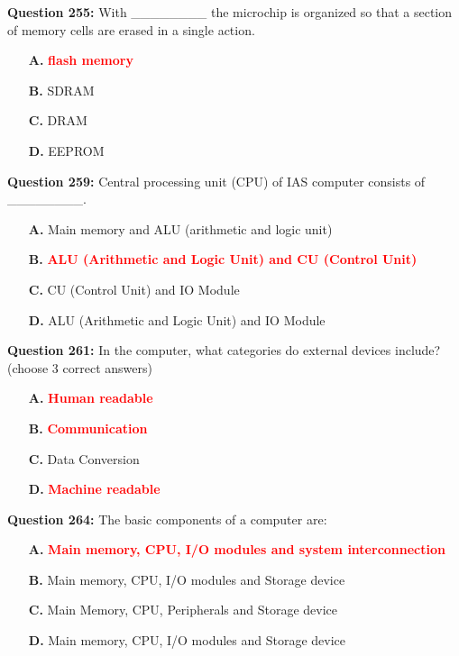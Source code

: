 \documentclass[12pt,a4paper]{article}
\begin{document}
\vspace{0.5cm}

\textbf{Question 255:} With ________ the microchip is organized so that a section of memory cells are erased in a single action.

\begin{itemize}
    \item[\textbf{A.}] \textcolor{red}{\textbf{flash memory}}
    \item[\textbf{B.}] SDRAM
    \item[\textbf{C.}] DRAM
    \item[\textbf{D.}] EEPROM
\end{itemize}

\vspace{0.5cm}

\textbf{Question 259:} Central processing unit (CPU) of IAS computer consists of ________.

\begin{itemize}
    \item[\textbf{A.}] Main memory and ALU (arithmetic and logic unit)
    \item[\textbf{B.}] \textcolor{red}{\textbf{ALU (Arithmetic and Logic Unit) and CU (Control Unit)}}
    \item[\textbf{C.}] CU (Control Unit) and IO Module
    \item[\textbf{D.}] ALU (Arithmetic and Logic Unit) and IO Module
\end{itemize}

\vspace{0.5cm}

\textbf{Question 261:} In the computer, what categories do external devices include? (choose 3 correct answers)

\begin{itemize}
    \item[\textbf{A.}] \textcolor{red}{\textbf{Human readable}}
    \item[\textbf{B.}] \textcolor{red}{\textbf{Communication}}
    \item[\textbf{C.}] Data Conversion
    \item[\textbf{D.}] \textcolor{red}{\textbf{Machine readable}}
\end{itemize}

\vspace{0.5cm}

\textbf{Question 264:} The basic components of a computer are:

\begin{itemize}
    \item[\textbf{A.}] \textcolor{red}{\textbf{Main memory, CPU, I/O modules and system interconnection}}
    \item[\textbf{B.}] Main memory, CPU, I/O modules and Storage device
    \item[\textbf{C.}] Main Memory, CPU, Peripherals and Storage device
    \item[\textbf{D.}] Main memory, CPU, I/O modules and Storage device
\end{itemize}
\end{document}
